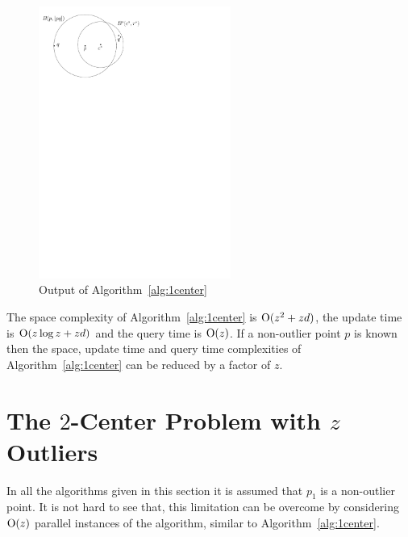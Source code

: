 \documentclass[envcountsame]{cls/cccg15}
\newcommand{\cO}{\ensuremath{{\rm O}}}
\begin{document}
\begin{figure}[h]
	\centering
	\includegraphics[width=17em]{figs/one-center}
	\caption{Output of Algorithm~\ref{alg:1center}}
	\label{fig:1center}
\end{figure}


The space complexity of Algorithm~\ref{alg:1center} is $\cO(z^2 + zd)$, the update time is $\cO (z \log z + zd)$ and the query time is $\cO (z)$.
If a non-outlier point $p$ is known then the space, update time and query time complexities of Algorithm~\ref{alg:1center} can be reduced by a factor of $z$.






\section{The $2$-Center Problem with $z$ Outliers}


In all the algorithms given in this section it is assumed that $p_1$ is a non-outlier point. It is not hard to see that, this limitation can be overcome by considering $\cO(z)$ parallel instances of the algorithm, similar to Algorithm~\ref{alg:1center}.
\end{document}
